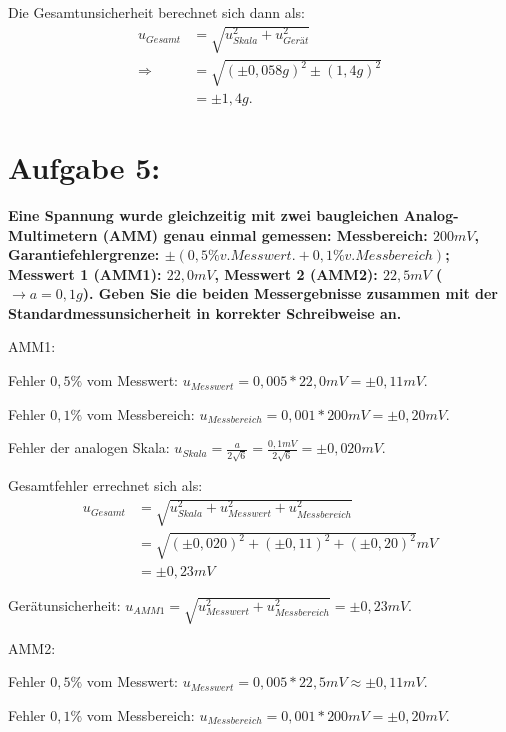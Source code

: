 \documentclass[
]{article}
\begin{document}
Die Gesamtunsicherheit berechnet sich dann als:
\begin{equation}\label{eq:uGes}
  \begin{split}
    u_{Gesamt} &= \sqrt{u_{Skala}^2+u_{Gerät}^2}\\
    \Rightarrow &= \sqrt{(\pm0,058g)^2\pm(1,4g)^2}\\
              &= \pm 1,4g.
  \end{split}
\end{equation}

\hypertarget{aufgabe-5}{%
\section{Aufgabe 5:}\label{aufgabe-5}}

\textbf{Eine Spannung wurde gleichzeitig mit zwei baugleichen
Analog-Multimetern (AMM) genau einmal gemessen: Messbereich: \(200 mV\),
Garantiefehlergrenze:
\(\pm (0,5\% v. Messwert. + 0,1\% v. Messbereich)\); Messwert 1 (AMM1):
\(22,0 mV\), Messwert 2 (AMM2): \(22,5 mV\) (\(\rightarrow a=0,1g\)).
Geben Sie die beiden Messergebnisse zusammen mit der
Standardmessunsicherheit in korrekter Schreibweise an.}

AMM1:

Fehler \(0,5\%\) vom Messwert:
\(u_{Messwert} = 0,005 * 22,0mV = \pm0,11mV\).

Fehler \(0,1\%\) vom Messbereich:
\(u_{Messbereich} = 0,001 * 200mV = \pm0,20mV\).

Fehler der analogen Skala:
\(u_{Skala} = \frac{a}{2\sqrt{6}} = \frac{0,1mV}{2\sqrt{6}}=\pm0,020mV\).

Gesamtfehler errechnet sich als: \begin{equation}\label{eq:uGesSMM}
  \begin{split}
u_{Gesamt} &= \sqrt{u_{Skala}^2+u_{Messwert}^2+u_{Messbereich}^2}\\
          &= \sqrt{(\pm 0,020)^2+(\pm 0,11)^2+(\pm0,20)^2}mV\\
          &= \pm 0,23mV
\end{split}
\end{equation}

Gerätunsicherheit:
\(u_{AMM1} = \sqrt{u_{Messwert}^2+u_{Messbereich}^2} = \pm0,23 mV\).

AMM2:

Fehler \(0,5\%\) vom Messwert:
\(u_{Messwert} = 0,005 * 22,5mV \approx \pm 0,11mV\).

Fehler \(0,1\%\) vom Messbereich:
\(u_{Messbereich} = 0,001 * 200mV = \pm0,20mV\).
\end{document}
